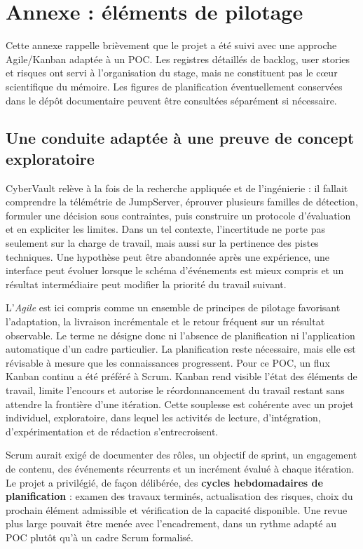 \documentclass[11pt,a4paper,oneside]{report}
\theoremstyle{definition}
\theoremstyle{plain}
\begin{document}
\appendix

\chapter{Annexe : éléments de pilotage}
\label{chap:app-management}

Cette annexe rappelle brièvement que le projet a été suivi avec une approche Agile/Kanban adaptée à un POC. Les registres détaillés de backlog, user stories et risques ont servi à l'organisation du stage, mais ne constituent pas le cœur scientifique du mémoire. Les figures de planification éventuellement conservées dans le dépôt documentaire peuvent être consultées séparément si nécessaire.

\section{Une conduite adaptée à une preuve de concept exploratoire}

CyberVault relève à la fois de la recherche appliquée et de l'ingénierie : il
fallait comprendre la télémétrie de JumpServer, éprouver plusieurs familles de
détection, formuler une décision sous contraintes, puis construire un protocole
d'évaluation et en expliciter les limites. Dans un tel contexte, l'incertitude
ne porte pas seulement sur la charge de travail, mais aussi sur la pertinence
des pistes techniques. Une hypothèse peut être abandonnée après une expérience,
une interface peut évoluer lorsque le schéma d'événements est mieux compris et
un résultat intermédiaire peut modifier la priorité du travail suivant.

L'\emph{Agile} est ici compris comme un ensemble de principes de pilotage
favorisant l'adaptation, la livraison incrémentale et le retour fréquent sur un
résultat observable. Le terme ne désigne donc ni l'absence de planification ni
l'application automatique d'un cadre particulier. La planification reste
nécessaire, mais elle est révisable à mesure que les connaissances progressent.
Pour ce POC, un flux Kanban continu a été préféré à Scrum. Kanban rend visible
l'état des éléments de travail, limite l'encours et autorise le réordonnancement
du travail restant sans attendre la frontière d'une itération. Cette souplesse
est cohérente avec un projet individuel, exploratoire, dans lequel les activités
de lecture, d'intégration, d'expérimentation et de rédaction s'entrecroisent.

Scrum aurait exigé de documenter des rôles, un objectif de sprint, un
engagement de contenu, des événements récurrents et un incrément évalué à chaque
itération. Le projet a privilégié, de façon délibérée, des
\textbf{cycles hebdomadaires de planification} : examen des travaux
terminés, actualisation des risques, choix du prochain élément admissible et
vérification de la capacité disponible. Une revue plus large pouvait être
menée avec l'encadrement, dans un rythme adapté au POC plutôt qu'à un cadre
Scrum formalisé.
\end{document}
